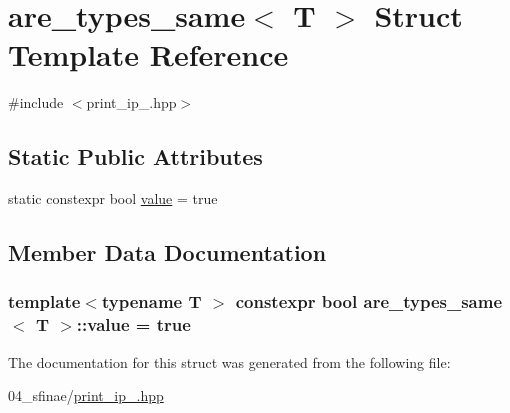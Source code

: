 \hypertarget{structare__types__same_3_01T_01_4}{}\section{are\+\_\+types\+\_\+same$<$ T $>$ Struct Template Reference}
\label{structare__types__same_3_01T_01_4}


{\ttfamily \#include $<$print\+\_\+ip\+\_.\+hpp$>$}

\subsection*{Static Public Attributes}
\begin{DoxyCompactItemize}
\item 
static constexpr bool \hyperlink{structare__types__same_3_01T_01_4_aff72e1e0439516ec1edac434035b9312}{value} = true
\end{DoxyCompactItemize}


\subsection{Member Data Documentation}
\subsubsection[{\texorpdfstring{value}{value}}]{\setlength{\rightskip}{0pt plus 5cm}template$<$typename T $>$ constexpr bool {\bf are\+\_\+types\+\_\+same}$<$ T $>$\+::value = true\hspace{0.3cm}{\ttfamily [static]}}\hypertarget{structare__types__same_3_01T_01_4_aff72e1e0439516ec1edac434035b9312}{}\label{structare__types__same_3_01T_01_4_aff72e1e0439516ec1edac434035b9312}


The documentation for this struct was generated from the following file\+:\begin{DoxyCompactItemize}
\item 
04\+\_\+sfinae/\hyperlink{print__ip__04_8hpp}{print\+\_\+ip\+\_.\+hpp}\end{DoxyCompactItemize}
